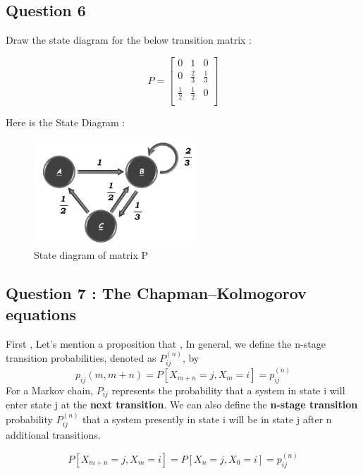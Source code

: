 \documentclass[a4paper]{article}
\begin{document}
		\subsection{\Large Question 6}
		Draw the state diagram for the below transition matrix :
		
		
			\begin{equation*}
			P = 
				\begin{bmatrix}
					0 & 1 &0\\
					0 & \frac{2}{3} &\frac{1}{3} \\
					\frac{1}{2} & \frac{1}{2} & 0\\
				\end{bmatrix}
			\end{equation*}
			
			Here is the State Diagram :
			
			\begin{figure}[htbp]
				\begin{center}
					\includegraphics[width= 6cm]{img/q6} 
				\end{center}
				\caption{State diagram of matrix P}
			\end{figure}
		\newpage
		
		\subsection{{\Large Question 7 :} The Chapman–Kolmogorov equations}
		
		First , Let's mention a proposition that ,
		In general, we define the n-stage transition probabilities, denoted as $P^{(n)}_{ij}$, by 
		\[p_{ij}(m , m+n) = P[X_{m+n} =j , X_{m} = i] = p^{(n)}_{ij}\]
		For a Markov chain, $P_{ij}$ represents the probability that a system in state i
		will enter state j at the \textbf{next transition}. We can also define the \textbf{n-stage transition}
		probability $P^{(n)}_{ij}$ that a system presently in state i will be in state j after n additional
		transitions.
		
		\[P[X_{m+n} =j , X_{m} = i] = P[X_{n} =j , X_{0} = i]  = p^{(n)}_{ij}\]
		
\end{document}
